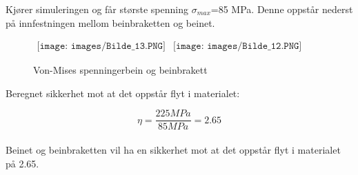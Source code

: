 Kjører simuleringen og får største spenning $\sigma_{max}$=85 MPa. Denne oppstår nederst på innfestningen mellom beinbraketten og beinet.

\begin{figure}[h]
\begin{center}$
\begin{array}{ccc}
\texttt{[image: images/Bilde\_13.PNG]} &
\texttt{[image: images/Bilde\_12.PNG]} &  
\end{array}$
\end{center}
\caption{Von-Mises spenningerbein og beinbrakett}
\end{figure}

Beregnet sikkerhet mot at det oppstår flyt i materialet:

\begin{equation}
\eta=\frac{225 MPa}{85 MPa}=2.65
\end{equation}\\

Beinet og beinbraketten vil ha en sikkerhet mot at det oppstår flyt i materialet på 2.65.
